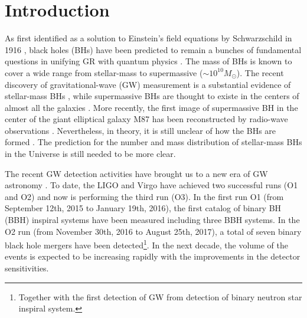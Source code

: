 \documentclass[twocolumn]{aastex62}
\begin{document}
\section{Introduction} \label{sec_intro}
As first identified as a solution to Einstein's field equations by Schwarzschild in 1916 \citep{Schwarzschild1999}, black holes (BHs) have been predicted to remain a bunches of fundamental questions in unifying GR with quantum physics \citep{Hawking1976, Giddings2017}. The mass of BHs is known to cover a wide range from stellar-mass to supermassive ($\sim10^{10} M_{\odot}$). The recent discovery of gravitational-wave (GW) measurement is a substantial evidence of stellar-mass BHs \citep{Abbott2016}, while supermassive BHs are thought to existe in the centers of almost all the galaxies \citep{Lynden-Bell1969, Kormendy1995}. More recently, the first image of supermassive BH in the center of the giant elliptical galaxy M87 has been reconstructed by radio-wave observations \citep{Alberdi2019}. Nevertheless, in theory, it is still unclear of how the BHs are formed \citep{Fryer1999, Fryer2001, Mirabel2016}. The prediction for the number and mass distribution of stellar-mass BHs in the Universe is still needed to be more clear.

The recent GW detection activities have brought us to a new era of GW astronomy \citep[e.g.,][]{Abbott2016, Abbott2016_sum, Abbott2018}. To date, the LIGO and Virgo have achieved two successful runs (O1 and O2) and now is performing the third run (O3). In the first run O1 (from September 12th, 2015 to January 19th, 2016), the first catalog of binary BH (BBH) inspiral systems have been measured including three BBH systems. In the O2 run (from November 30th, 2016 to August 25th, 2017), a total of seven binary black hole mergers have been detected\footnote{Together with the first detection of GW from detection of binary neutron star inspiral system.}. In the next decade, the volume of the events is expected to be increasing rapidly with the improvements in the detector sensitivities.
\end{document}

